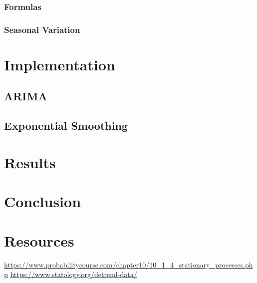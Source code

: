 \documentclass{article}
\begin{document}
  \subsubsection{Formulas}
  \subsubsection{Seasonal Variation}

  \section{Implementation}
  \subsection{ARIMA}
  \subsection{Exponential Smoothing}

  \section{Results}

  \section{Conclusion}

  \section{Resources}
  \url{https://www.probabilitycourse.com/chapter10/10_1_4_stationary_processes.php}
  \url{https://www.statology.org/detrend-data/}

  \newpage
\end{document}
